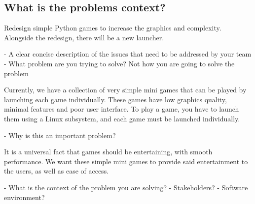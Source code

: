 \documentclass{article}
\begin{document}
\subsection{What is the problems context?}

Redesign simple Python games to increase the graphics and complexity.
Alongside the redesign, there will be a new launcher. 

- A clear concise description of the issues that need to be addressed by your team
- What problem are you trying to solve? Not how you are going to solve the problem

Currently, we have a collection of very simple mini games that can be played by launching each game individually. These games have 
low graphics quality, minimal features and poor user interface. To play a game, you have to launch them using a Linux subsystem, and each
game must be launched individually.

- Why is this an important problem?

It is a universal fact that games should be entertaining, with smooth performance. We want these simple mini games to provide said
entertainment to the users, as well as ease of access.

- What is the context of the problem you are solving?
	- Stakeholders?
	- Software environment?
	





\end{document}
